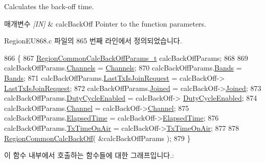 Calculates the back-\/off time. 


\begin{DoxyParams}{매개변수}
{\em \mbox{[}\+I\+N\mbox{]}} & calc\+Back\+Off Pointer to the function parameters. \\
\hline
\end{DoxyParams}


Region\+E\+U868.\+c 파일의 865 번째 라인에서 정의되었습니다.


\begin{DoxyCode}
866 \{
867     \mbox{\hyperlink{structs_region_common_calc_back_off_params}{RegionCommonCalcBackOffParams\_t}} calcBackOffParams;
868 
869     calcBackOffParams.\mbox{\hyperlink{structs_region_common_calc_back_off_params_afecbd1e457cbd79eb7072bd140ff33d4}{Channels}} = \mbox{\hyperlink{_region_e_u868_8c_a2f381382b4cbbe721da7b980ec467229}{Channels}};
870     calcBackOffParams.\mbox{\hyperlink{structs_region_common_calc_back_off_params_a18afce97f43b46e9d294e5babbb15f15}{Bands}} = \mbox{\hyperlink{_region_e_u868_8c_a47eef5d43d561ee2fcab661437818ae3}{Bands}};
871     calcBackOffParams.\mbox{\hyperlink{structs_region_common_calc_back_off_params_a4088d0ca2ff21fd5cdc110e14816dd53}{LastTxIsJoinRequest}} = calcBackOff->
      \mbox{\hyperlink{structs_calc_back_off_params_a4088d0ca2ff21fd5cdc110e14816dd53}{LastTxIsJoinRequest}};
872     calcBackOffParams.\mbox{\hyperlink{structs_region_common_calc_back_off_params_ac2f6caa0f3b02d2ac5056c3ee7c22652}{Joined}} = calcBackOff->\mbox{\hyperlink{structs_calc_back_off_params_ac2f6caa0f3b02d2ac5056c3ee7c22652}{Joined}};
873     calcBackOffParams.\mbox{\hyperlink{structs_region_common_calc_back_off_params_a4d755868e0e80089462286c3ba6a6f18}{DutyCycleEnabled}} = calcBackOff->
      \mbox{\hyperlink{structs_calc_back_off_params_a4d755868e0e80089462286c3ba6a6f18}{DutyCycleEnabled}};
874     calcBackOffParams.\mbox{\hyperlink{structs_region_common_calc_back_off_params_a1ca6f01ca18afe402de51babe8c95f5e}{Channel}} = calcBackOff->\mbox{\hyperlink{structs_calc_back_off_params_a1ca6f01ca18afe402de51babe8c95f5e}{Channel}};
875     calcBackOffParams.\mbox{\hyperlink{structs_region_common_calc_back_off_params_a2ece30988e7a5bac284623173173c71a}{ElapsedTime}} = calcBackOff->\mbox{\hyperlink{structs_calc_back_off_params_a2ece30988e7a5bac284623173173c71a}{ElapsedTime}};
876     calcBackOffParams.\mbox{\hyperlink{structs_region_common_calc_back_off_params_aa17a8607485db100d315e74853dd217e}{TxTimeOnAir}} = calcBackOff->\mbox{\hyperlink{structs_calc_back_off_params_aa17a8607485db100d315e74853dd217e}{TxTimeOnAir}};
877 
878     \mbox{\hyperlink{group___r_e_g_i_o_n_c_o_m_m_o_n_gae2b1dfba27c79f605048f2d9869dc57d}{RegionCommonCalcBackOff}}( &calcBackOffParams );
879 \}
\end{DoxyCode}
이 함수 내부에서 호출하는 함수들에 대한 그래프입니다.\+:
\mbox{\label{group___r_e_g_i_o_n_e_u868_ga8c63acfe556cf427ba83e5429f2ec1d9}} 
